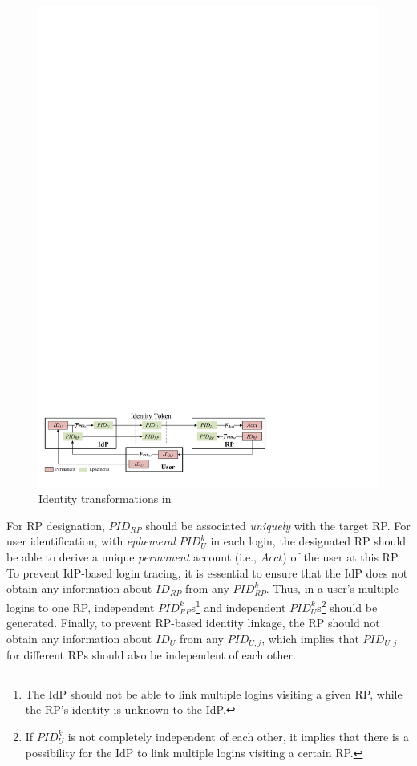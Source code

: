 \begin{figure}[b]
  \centering
  \includegraphics[width=1.00\linewidth]{fig/IDCorrelation.pdf}
  \caption{Identity transformations in \usso} %
  \label{fig:IDCorrelation}
\end{figure}

For RP designation, $PID_{RP}$ should be associated \emph{uniquely} with the target RP.
For user identification, with \emph{ephemeral} $PID_{U}^k$ in each login, the designated RP should be able to derive a unique \emph{permanent} account  (i.e., $Acct$) of the user at this RP.
To prevent IdP-based login tracing, it is essential to ensure that the IdP does not obtain any information about $ID_{RP}$ from any $PID_{RP}^k$.
Thus, in a user's multiple logins to one RP,
independent $PID_{RP}^k$s\footnote{The IdP should not be able to link multiple logins visiting a given RP, while the RP's identity is unknown to the IdP.} 
and independent $PID_U^k$s\footnote{If $PID_U^k$ is not completely independent of each other, it implies that there is a possibility for the IdP to link multiple logins visiting a certain RP.} should be generated.
Finally, to prevent RP-based identity linkage,
the RP should not obtain any information about $ID_U$ from any $PID_{U,j}$, which implies that $PID_{U,j}$ for different RPs should also be independent of each other.


